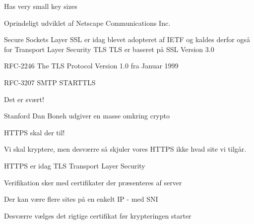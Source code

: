 \documentclass[Screen16to9,17pt]{foils}
\begin{document}
\begin{list2}
\item {}
\item Has very small key sizes
\end{list2}





\begin{list1}
\item Oprindeligt udviklet af Netscape Communications Inc.
\item Secure Sockets Layer SSL er idag blevet adopteret af IETF og kaldes
derfor også for Transport Layer Security TLS
TLS er baseret på SSL Version 3.0
\item RFC-2246 The TLS Protocol Version 1.0 fra Januar 1999
\item RFC-3207 SMTP STARTTLS
\item Det er svært!
\item Stanford Dan Boneh udgiver en masse omkring crypto\\ 
\end{list1}


HTTPS skal der til!



Vi skal kryptere, men desværre så skjuler vores HTTPS ikke hvad site vi tilgår.

\begin{list2}
\item HTTPS er idag TLS Transport Layer Security
\item Verifikation sker med certifikater der præsenteres af server
\item Der kan være flere sites på en enkelt IP - med SNI
\item Desværre vælges det rigtige certifikat før krypteringen starter
\end{list2}







\end{document}
